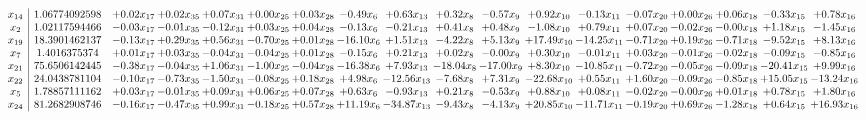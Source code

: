 \documentclass[9pt]{article}
\begin{document}
 \[\begin{array}{c| c c@{\hskip 2pt} c@{\hskip 2pt} c@{\hskip 2pt} c@{\hskip 2pt} c@{\hskip 2pt} c@{\hskip 2pt} c@{\hskip 2pt} c@{\hskip 2pt} c@{\hskip 2pt} c@{\hskip 2pt} c@{\hskip 2pt} c@{\hskip 2pt} c@{\hskip 2pt} c@{\hskip 2pt} c@{\hskip 2pt} c@{\hskip 2pt} }
 x_{14}   &  1.06774092598 & +  0.02 x_{17} & +  0.02 x_{35} & +  0.07 x_{31} & +  0.00 x_{25} & +  0.03 x_{28} & -0.49 x_{6} & +  0.63 x_{13} & +  0.32 x_{8} & -0.57 x_{9} & +  0.92 x_{10} & -0.13 x_{11} & -0.07 x_{20} & +  0.00 x_{26} & +  0.06 x_{18} & -0.33 x_{15} & +  0.78 x_{16}\\
 x_{2}   &  1.02117594466 & -0.03 x_{17} & -0.01 x_{35} & -0.12 x_{31} & +  0.03 x_{25} & +  0.04 x_{28} & -0.13 x_{6} & -0.21 x_{13} & +  0.41 x_{8} & +  0.48 x_{9} & -1.08 x_{10} & +  0.79 x_{11} & +  0.07 x_{20} & -0.02 x_{26} & -0.00 x_{18} & +  1.18 x_{15} & -1.45 x_{16}\\
 x_{19}   &  18.3901462137 & -0.13 x_{17} & +  0.29 x_{35} & +  0.56 x_{31} & -0.70 x_{25} & +  0.01 x_{28} & -16.10 x_{6} & +  1.51 x_{13} & -4.22 x_{8} & +  5.13 x_{9} & + 17.49 x_{10} & -14.25 x_{11} & -0.71 x_{20} & +  0.19 x_{26} & -0.71 x_{18} & -9.52 x_{15} & +  8.13 x_{16}\\
 x_{7}   &  1.4016375374 & +  0.01 x_{17} & +  0.03 x_{35} & -0.04 x_{31} & -0.04 x_{25} & +  0.01 x_{28} & -0.15 x_{6} & +  0.21 x_{13} & +  0.02 x_{8} & -0.00 x_{9} & +  0.30 x_{10} & -0.01 x_{11} & +  0.03 x_{20} & -0.01 x_{26} & -0.02 x_{18} & -0.09 x_{15} & -0.85 x_{16}\\
 x_{21}   &  75.6506142445 & -0.38 x_{17} & -0.04 x_{35} & +  1.06 x_{31} & -1.00 x_{25} & -0.04 x_{28} & -16.38 x_{6} & +  7.93 x_{13} & -18.04 x_{8} & -17.00 x_{9} & +  8.30 x_{10} & -10.85 x_{11} & -0.72 x_{20} & -0.05 x_{26} & -0.09 x_{18} & -20.41 x_{15} & +  9.99 x_{16}\\
 x_{22}   &  24.0438781104 & -0.10 x_{17} & -0.73 x_{35} & -1.50 x_{31} & -0.08 x_{25} & +  0.18 x_{28} & +  4.98 x_{6} & -12.56 x_{13} & -7.68 x_{8} & +  7.31 x_{9} & -22.68 x_{10} & +  0.55 x_{11} & +  1.60 x_{20} & -0.09 x_{26} & -0.85 x_{18} & + 15.05 x_{15} & -13.24 x_{16}\\
 x_{5}   &  1.78857111162 & +  0.03 x_{17} & -0.01 x_{35} & +  0.09 x_{31} & +  0.06 x_{25} & +  0.07 x_{28} & +  0.63 x_{6} & -0.93 x_{13} & +  0.21 x_{8} & -0.53 x_{9} & +  0.88 x_{10} & +  0.08 x_{11} & -0.02 x_{20} & -0.00 x_{26} & +  0.01 x_{18} & +  0.78 x_{15} & +  1.80 x_{16}\\
 x_{24}   &  81.2682908746 & -0.16 x_{17} & -0.47 x_{35} & +  0.99 x_{31} & -0.18 x_{25} & +  0.57 x_{28} & + 11.19 x_{6} & -34.87 x_{13} & -9.43 x_{8} & -4.13 x_{9} & + 20.85 x_{10} & -11.71 x_{11} & -0.19 x_{20} & +  0.69 x_{26} & -1.28 x_{18} & +  0.64 x_{15} & + 16.93 x_{16}\\

\end{array}\]
\end{document}
